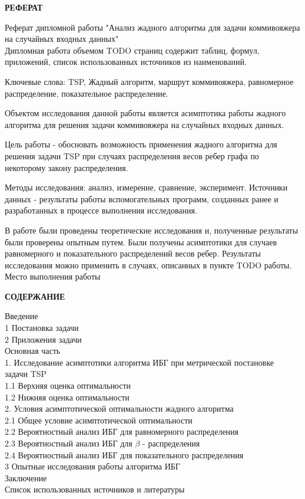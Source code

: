 \documentclass[a4paper, 14pt]{extarticle}
\begin{document}
\newpage

\begin{center}
 \textbf{РЕФЕРАТ}
\end{center}

Реферат дипломной работы "Анализ жадного алгоритма для задачи 
коммивояжера на случайных входных данных"\\

Дипломная работа объемом TODO страниц содержит таблиц, формул, приложений, список использованных источников из наименований.

Ключевые слова: TSP, Жадный алгоритм, маршрут коммивояжера, равномерное распределение, показательное распределение.

Объектом исследования данной работы является асимптотика работы жадного алгоритма для решения задачи коммивояжера на случайных входных данных. 

Цель работы - обосновать возможность применения жадного алгоритма для решения задачи TSP при случаях распределения весов ребер графа по некоторому закону распределения. 

Методы исследования: анализ, измерение, сравнение, эксперимент. Источники данных - результаты работы вспомогательных программ, созданных ранее и разработанных в процессе выполнения исследования.

В работе были проведены теоретические исследования и, полученные результаты были проверены опытным путем. Были получены асимптотики для случаев равномерного и показательного распределений весов ребер. Результаты исследования можно применить в случаях, описанных в пункте TODO работы.\\

Место выполнения работы\\

\newpage

\begin{center}
 \textbf{СОДЕРЖАНИЕ}
\end{center}

\noindent Введение\\
1 Постановка задачи\\
2 Приложения задачи\\
Основная часть\\
1. Исследование асимптотики алгоритма ИБГ при метрической постановке\\ задачи TSP\\
1.1 Верхняя оценка оптимальности\\
1.2 Нижняя оценка оптимальности\\
2. Условия асимптотической оптимальности жадного алгоритма\\
2.1 Общее условие асимптотической оптимальности\\
2.2 Вероятностный анализ ИБГ для равномерного распределения\\
2.3 Вероятностный анализ ИБГ для $\beta$ - распределения\\
2.4 Вероятностный анализ ИБГ для показательного распределения\\
3 Опытные исследования работы алгоритма ИБГ\\
Заключение\\
Список использованных источников и литературы\\
\end{document}
